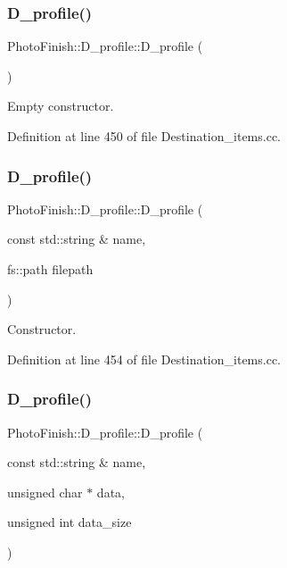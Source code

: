\subsubsection{\texorpdfstring{D\+\_\+profile()}{D\_profile()}\hspace{0.1cm}{\footnotesize\ttfamily [1/4]}}
{\footnotesize\ttfamily Photo\+Finish\+::\+D\+\_\+profile\+::\+D\+\_\+profile (\begin{DoxyParamCaption}{ }\end{DoxyParamCaption})}



Empty constructor. 



Definition at line 450 of file Destination\+\_\+items.\+cc.

\mbox{\label{class_photo_finish_1_1_d__profile_ab5b6dfde7c76fad1a4598a81800dc739}} 
\subsubsection{\texorpdfstring{D\+\_\+profile()}{D\_profile()}\hspace{0.1cm}{\footnotesize\ttfamily [2/4]}}
{\footnotesize\ttfamily Photo\+Finish\+::\+D\+\_\+profile\+::\+D\+\_\+profile (\begin{DoxyParamCaption}\item[{const std\+::string \&}]{name,  }\item[{fs\+::path}]{filepath }\end{DoxyParamCaption})}



Constructor. 



Definition at line 454 of file Destination\+\_\+items.\+cc.

\mbox{\label{class_photo_finish_1_1_d__profile_a3e1e0feb533ad141de8bfd071ecfb6af}} 
\subsubsection{\texorpdfstring{D\+\_\+profile()}{D\_profile()}\hspace{0.1cm}{\footnotesize\ttfamily [3/4]}}
{\footnotesize\ttfamily Photo\+Finish\+::\+D\+\_\+profile\+::\+D\+\_\+profile (\begin{DoxyParamCaption}\item[{const std\+::string \&}]{name,  }\item[{unsigned char $\ast$}]{data,  }\item[{unsigned int}]{data\+\_\+size }\end{DoxyParamCaption})}




